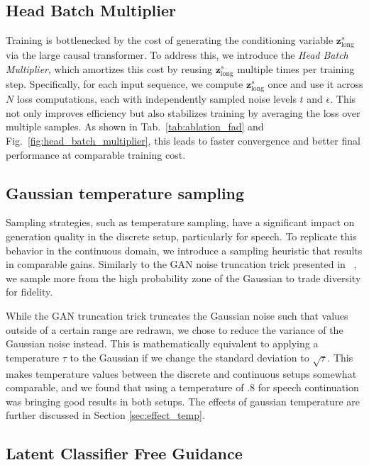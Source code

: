 \subsection{Head Batch Multiplier}

Training is bottlenecked by the cost of generating the conditioning variable $\mathbf{z}^s_{\text{long}}$ via the large causal transformer. To address this, we introduce the \textit{Head Batch Multiplier}, which amortizes this cost by reusing $\mathbf{z}^s_{\text{long}}$ multiple times per training step. Specifically, for each input sequence, we compute $\mathbf{z}^s_{\text{long}}$ once and use it across $N$ loss computations, each with independently sampled noise levels $t$ and $\epsilon$. This not only improves efficiency but also stabilizes training by averaging the loss over multiple samples. As shown in Tab.~\ref{tab:ablation_fad} and Fig.~\ref{fig:head_batch_multiplier}, this leads to faster convergence and better final performance at comparable training cost.




\subsection{Gaussian temperature sampling}
Sampling strategies, such as temperature sampling, have a significant impact on generation quality in the discrete setup, particularly for speech. To replicate this behavior in the continuous domain, we introduce a sampling heuristic that results in comparable gains. Similarly to the GAN noise truncation trick presented in ~\cite{gan_truncation_trick}, we sample more from the high probability zone of the Gaussian to trade diversity for fidelity.

While the GAN truncation trick truncates the Gaussian noise such that values outside of a certain range are redrawn, we chose to reduce the variance of the Gaussian noise instead. This is mathematically equivalent to applying a temperature $\tau$ to the Gaussian if we change the standard deviation to $\sqrt{\tau}$. This makes temperature values between the discrete and continuous setups somewhat comparable, and we found that using a temperature of .8 for speech continuation was bringing good results in both setups. The effects of gaussian temperature are further discussed in Section \ref{sec:effect_temp}.


\subsection{Latent Classifier Free Guidance}

